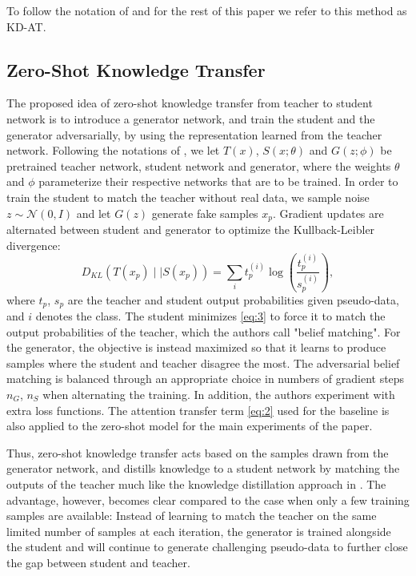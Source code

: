 To follow the notation of \cite{zagoruyko2016paying} and \cite{Micaelli2019ZeroShotKT} for the rest of this paper we refer to this method as KD-AT. 

\subsection{Zero-Shot Knowledge Transfer}

The proposed idea of zero-shot knowledge transfer from teacher to student network is to introduce a generator network, and train the student and the generator adversarially, by using the representation learned from the teacher network. Following the notations of \cite{Micaelli2019ZeroShotKT}, we let $T(x)$, $S(x; \theta)$ and $G(z; \phi)$ be pretrained teacher network, student network and  generator, where the weights $\theta$ and $\phi$ parameterize their respective networks that are to be trained. In order to train the student to match the teacher without real data, we sample noise $z \sim \mathcal{N}(0, I)$ and let $G(z)$ generate fake samples $x_p$. Gradient updates are alternated between student and generator to optimize the Kullback-Leibler divergence:
\useshortskip
\begin{equation}
    D_{KL}(T(x_p)\mid \mid S(x_p)) = \sum_i t_p^{(i)}\log\left(\frac{t_p^{(i)}}{s_p^{(i)}}\right),\label{eq:3}
\end{equation}
\useshortskip
where $t_p$, $s_p$ are the teacher and student output probabilities given pseudo-data, and $i$ denotes the class. The student minimizes \eqref{eq:3} to force it to match the output probabilities of the teacher, which the authors call "belief matching". For the generator, the objective is instead maximized so that it learns to produce samples where the student and teacher disagree the most. The adversarial belief matching is balanced through an appropriate choice  in numbers of gradient steps $n_G$, $n_S$ when alternating the training. In addition, the authors experiment with extra loss functions. The attention transfer term \eqref{eq:2} used for the baseline is also applied to the zero-shot model for the main experiments of the paper.

Thus, zero-shot knowledge transfer acts based on the samples drawn from the generator network, and distills knowledge to a student network by matching the outputs of the teacher much like the knowledge distillation approach in \cite{hinton2015distilling}. The advantage, however, becomes clear compared to the case when only a few training samples are available: Instead of learning to match the teacher on the same limited number of samples at each iteration, the generator is trained alongside the student and will continue to generate challenging pseudo-data to further close the gap between student and teacher.

